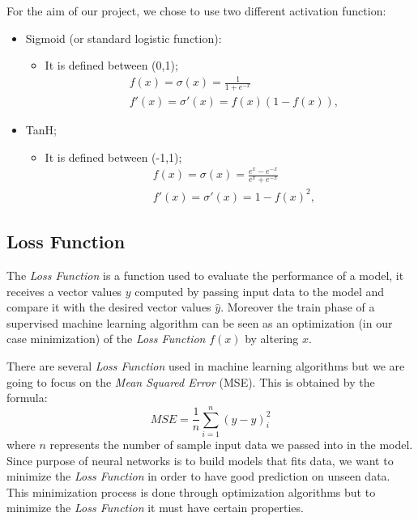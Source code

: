 For the aim of our project, we chose to use two different activation function:
\begin{itemize}
	\label{sigmoid}
	\item Sigmoid (or standard logistic function):
	\begin{itemize}
		\item It is defined between (0,1); 		
			\begin{align*}
			&f(x) = \sigma(x) = \frac{1}{1 + e^{-x}} \\
			&f'(x) = \sigma'(x) = f(x)(1 - f(x)),
			\end{align*} 
	\end{itemize}
	\item TanH;
	\label{tanH}
	\begin{itemize}
		\item It is defined between (-1,1); 		
		\begin{align*}
		&f(x) = \sigma(x) = \frac{e^{x}-e^{-x}}{e^{x} + e^{-x}} \\
		&f'(x) = \sigma'(x) = 1 - f(x)^{2},
		\end{align*} 
	\end{itemize}
\end{itemize}
\subsection{Loss Function}
The \textit{Loss Function} is a function used to evaluate the performance of a model, it receives a vector values $y$ computed by passing input data to the model and compare it with the desired vector values $\widehat{y}$.
Moreover the train phase of a supervised machine learning algorithm can be seen as an optimization (in our case minimization) of the \textit{Loss Function} $f(x)$ by altering $x$.   

There are several \textit{Loss Function} used in machine learning algorithms but we are going to focus on the \textit{Mean Squared Error} (MSE). This is obtained by the formula: 	
\begin{equation}
MSE = \frac{1}{n} \sum_{i=1}^n (\widehat{y}-y)_{i}^2
\end{equation}
where $n$ represents the number of sample input data we passed into in the model. Since purpose of neural networks is to build models that fits data, we want to minimize the \textit{Loss Function} in order to have good prediction on unseen data. This minimization process is done through optimization algorithms but to minimize the \textit{Loss Function} it must have certain properties.	

